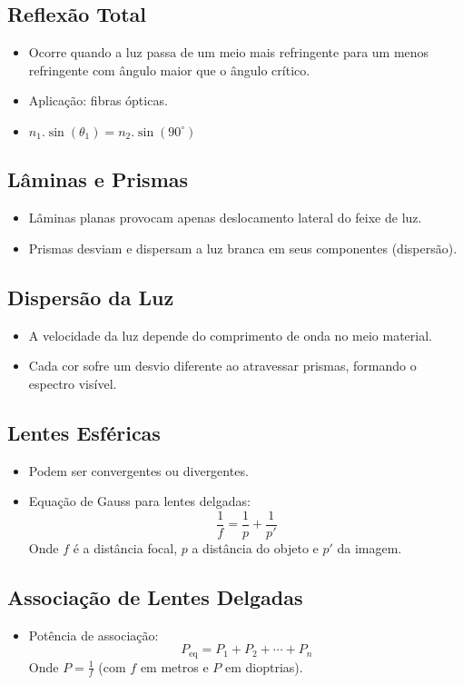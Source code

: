 \documentclass[a4paper,12pt]{article}
\begin{document}
\begin{multicols}{2}
\subsection{Reflexão Total}
\begin{itemize}
    \item Ocorre quando a luz passa de um meio mais refringente para um menos refringente com ângulo maior que o ângulo crítico.
    \item Aplicação: fibras ópticas.
    \item $n_{1}.\sin(\theta_{1}) = n_{2}.\sin(90^{\circ})$
\end{itemize}

\subsection{Lâminas e Prismas}
\begin{itemize}
    \item Lâminas planas provocam apenas deslocamento lateral do feixe de luz.
    \item Prismas desviam e dispersam a luz branca em seus componentes (dispersão).
\end{itemize}

\subsection{Dispersão da Luz}
\begin{itemize}
    \item A velocidade da luz depende do comprimento de onda no meio material.
    \item Cada cor sofre um desvio diferente ao atravessar prismas, formando o espectro visível.
\end{itemize}

\subsection{Lentes Esféricas}
\begin{itemize}
    \item Podem ser convergentes ou divergentes.
    \item Equação de Gauss para lentes delgadas:
    \[
        \frac{1}{f} = \frac{1}{p} + \frac{1}{p'}
    \]
    Onde $f$ é a distância focal, $p$ a distância do objeto e $p'$ da imagem.
\end{itemize}

\subsection{Associação de Lentes Delgadas}
\begin{itemize}
    \item Potência de associação:
    \[
        P_{\text{eq}} = P_1 + P_2 + \cdots + P_n
    \]
    Onde $P = \frac{1}{f}$ (com $f$ em metros e $P$ em dioptrias).
\end{itemize}


\end{multicols}
\end{document}
